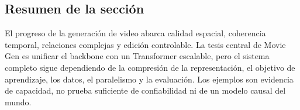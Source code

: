 
\subsection{Resumen de la sección}

El progreso de la generación de video abarca calidad espacial, coherencia temporal, relaciones complejas y edición controlable. La tesis central de Movie Gen es unificar el backbone con un Transformer escalable, pero el sistema completo sigue dependiendo de la compresión de la representación, el objetivo de aprendizaje, los datos, el paralelismo y la evaluación. Los ejemplos son evidencia de capacidad, no prueba suficiente de confiabilidad ni de un modelo causal del mundo.
